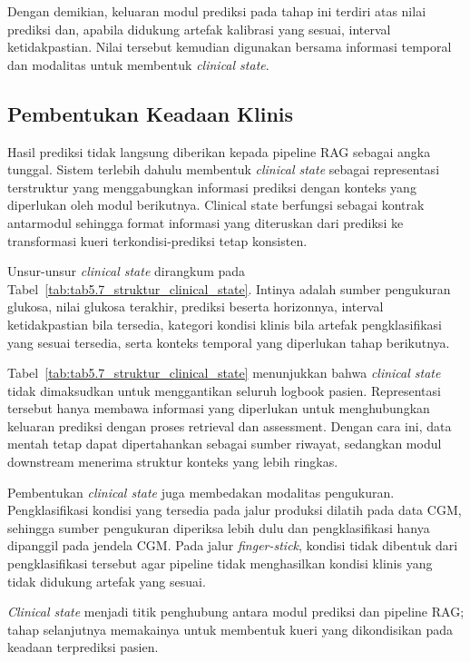 Dengan demikian, keluaran modul prediksi pada tahap ini terdiri atas nilai prediksi dan, apabila didukung artefak kalibrasi yang sesuai, interval ketidakpastian. Nilai tersebut
kemudian digunakan bersama informasi temporal dan modalitas untuk membentuk \textit{clinical state}.

\subsection{Pembentukan Keadaan Klinis}
\label{subsec:bab5-clinical-state}

Hasil prediksi tidak langsung diberikan kepada pipeline RAG sebagai angka tunggal. Sistem terlebih dahulu membentuk \textit{clinical state} sebagai representasi terstruktur
yang menggabungkan informasi prediksi dengan konteks yang diperlukan oleh modul berikutnya. Clinical state berfungsi sebagai kontrak antarmodul sehingga format informasi
yang diteruskan dari prediksi ke transformasi kueri terkondisi-prediksi tetap konsisten.

Unsur-unsur \textit{clinical state} dirangkum pada Tabel~\ref{tab:tab5.7_struktur_clinical_state}. Intinya adalah sumber pengukuran glukosa, nilai glukosa terakhir,
prediksi beserta horizonnya, interval ketidakpastian bila tersedia, kategori kondisi klinis bila artefak pengklasifikasi yang sesuai tersedia, serta konteks temporal
yang diperlukan tahap berikutnya.



Tabel~\ref{tab:tab5.7_struktur_clinical_state} menunjukkan bahwa \textit{clinical state} tidak dimaksudkan untuk menggantikan seluruh logbook pasien. Representasi tersebut hanya
membawa informasi yang diperlukan untuk menghubungkan keluaran prediksi dengan proses retrieval dan assessment. Dengan cara ini, data mentah tetap dapat dipertahankan
sebagai sumber riwayat, sedangkan modul downstream menerima struktur konteks yang lebih ringkas.

Pembentukan \textit{clinical state} juga membedakan modalitas pengukuran. Pengklasifikasi kondisi yang tersedia pada jalur produksi dilatih pada data CGM, sehingga
sumber pengukuran diperiksa lebih dulu dan pengklasifikasi hanya dipanggil pada jendela CGM. Pada jalur \textit{finger-stick}, kondisi tidak dibentuk dari
pengklasifikasi tersebut agar pipeline tidak menghasilkan kondisi klinis yang tidak didukung artefak yang sesuai.

\textit{Clinical state} menjadi titik penghubung antara modul prediksi dan pipeline RAG; tahap selanjutnya memakainya untuk membentuk kueri yang dikondisikan pada
keadaan terprediksi pasien.

